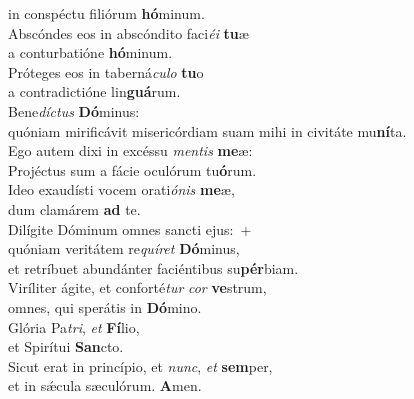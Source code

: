 \evenverse in conspéctu filiórum \textbf{hó}minum.\\
\oddverse Abscóndes eos in abscóndito faci\textit{é}\textit{i} \textbf{tu}æ~\*\\
\oddverse a conturbatióne \textbf{hó}minum.\\
\evenverse Próteges eos in taberná\textit{cu}\textit{lo} \textbf{tu}o~\*\\
\evenverse a contradictióne lin\textbf{guá}rum.\\
\oddverse Bene\textit{dí}\textit{ctus} \textbf{Dó}minus:~\*\\
\oddverse quóniam mirificávit misericórdiam suam mihi in civitáte mu\textbf{ní}ta.\\
\evenverse Ego autem dixi in excéssu \textit{men}\textit{tis} \textbf{me}æ:~\*\\
\evenverse Projéctus sum a fácie oculórum tu\textbf{ó}rum.\\
\oddverse Ideo exaudísti vocem orati\textit{ó}\textit{nis} \textbf{me}æ,~\*\\
\oddverse dum clamárem \textbf{ad} te.\\
\evenverse Dilígite Dóminum omnes sancti ejus:~+\\
\evenverse  quóniam veritátem re\textit{quí}\textit{ret} \textbf{Dó}minus,~\*\\
\evenverse et retríbuet abundánter faciéntibus su\textbf{pér}biam.\\
\oddverse Viríliter ágite, et conforté\textit{tur} \textit{cor} \textbf{ve}strum,~\*\\
\oddverse omnes, qui sperátis in \textbf{Dó}mino.\\
\evenverse Glória Pa\textit{tri}, \textit{et} \textbf{Fí}lio,~\*\\
\evenverse et Spirítui \textbf{San}cto.\\
\oddverse Sicut erat in princípio, et \textit{nunc}, \textit{et} \textbf{sem}per,~\*\\
\oddverse et in sǽcula sæculórum. \textbf{A}men.\\
